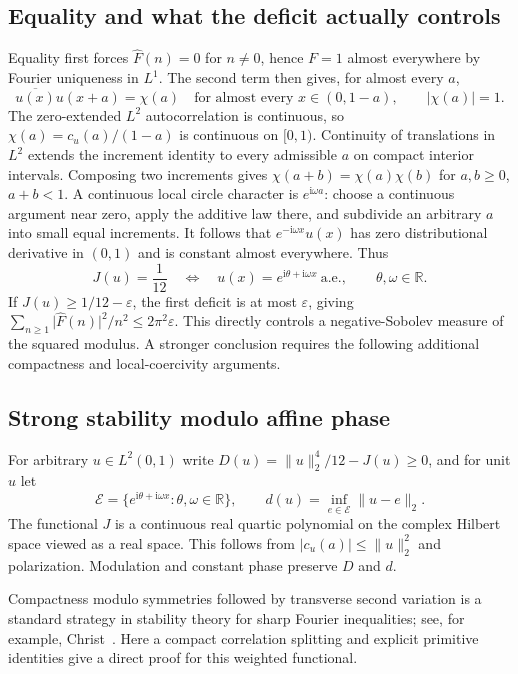\documentclass[11pt,reqno]{amsart}
\numberwithin{equation}{section}
\newcommand{\R}{\mathbb R}
\newcommand{\ii}{\mathrm i}
\newcommand{\norm}[1]{\lVert#1\rVert}
\newcommand{\abs}[1]{\lvert#1\rvert}
\begin{document}
\subsection*{Equality and what the deficit actually controls}

Equality first forces $\widehat F(n)=0$ for $n\ne0$, hence
$F=1$ almost everywhere by Fourier uniqueness in $L^1$.
The second term then gives, for almost every $a$,
\[
 \overline{u(x)}u(x+a)=\chi(a)\quad\text{for almost every }x\in(0,1-a),
 \qquad\abs{\chi(a)}=1.
\]
The zero-extended $L^2$ autocorrelation is continuous, so
$\chi(a)=c_u(a)/(1-a)$ is continuous on $[0,1)$.
Continuity of translations in $L^2$ extends the increment identity
to every admissible $a$ on compact interior intervals.
Composing two increments gives
$\chi(a+b)=\chi(a)\chi(b)$ for $a,b\ge0$, $a+b<1$.
A continuous local circle character is $e^{\ii\omega a}$:
choose a continuous argument near zero, apply the additive law
there, and subdivide an arbitrary $a$ into small equal increments.
It follows that $e^{-\ii\omega x}u(x)$ has zero distributional
derivative in $(0,1)$ and is constant almost everywhere. Thus
\begin{equation}\label{eq:profile-equality}
 J(u)=\frac1{12}\quad\Longleftrightarrow\quad
 u(x)=e^{\ii\theta+\ii\omega x}\ \text{a.e.},\qquad \theta,\omega\in\R.
\end{equation}
If $J(u)\ge1/12-\varepsilon$, the first deficit is at most
$\varepsilon$, giving
$\sum_{n\ge1}\abs{\widehat F(n)}^2/n^2\le2\pi^2\varepsilon$.
This directly controls a negative-Sobolev measure of the squared
modulus. A stronger conclusion requires the following additional
compactness and local-coercivity arguments.

\subsection*{Strong stability modulo affine phase}

For arbitrary $u\in L^2(0,1)$ write
$D(u)=\norm u_2^4/12-J(u)\ge0$, and for unit $u$ let
\[
 \mathcal E=\{e^{\ii\theta+\ii\omega x}:\theta,\omega\in\R\},
 \qquad d(u)=\inf_{e\in\mathcal E}\norm{u-e}_2.
\]
The functional $J$ is a continuous real quartic polynomial on
the complex Hilbert space viewed as a real space. This follows
from $\abs{c_u(a)}\le\norm u_2^2$ and polarization.
Modulation and constant phase preserve $D$ and $d$.

Compactness modulo symmetries followed by transverse second
variation is a standard strategy in stability theory for sharp
Fourier inequalities; see, for example, Christ~\cite{Christ}.
Here a compact correlation splitting and explicit primitive
identities give a direct proof for this weighted functional.
\end{document}
